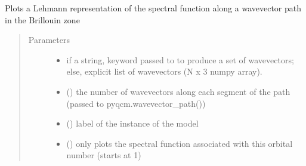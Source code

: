 \documentclass[letterpaper,10pt,english]{sphinxmanual}
\begin{document}
\begin{fulllineitems}
\label{\detokenize{spectral:pyqcm.spectral.spectral_function_Lehmann}}
\sphinxAtStartPar
Plots a Lehmann representation of the spectral function along a wavevector path in the Brillouin zone
\begin{quote}\begin{description}
\item[{Parameters}] \leavevmode\begin{itemize}
\item {} 
\sphinxAtStartPar
{} \textendash{} if a string, keyword passed to  to produce a set of wavevectors; else, explicit list of wavevectors (N x 3 numpy array).

\item {} 
\sphinxAtStartPar
{} () \textendash{} the number of wavevectors along each segment of the path (passed to pyqcm.wavevector\_path())

\item {} 
\sphinxAtStartPar
{} () \textendash{} label of the instance of the model

\item {} 
\sphinxAtStartPar
{} () \textendash{} only plots the spectral function associated with this orbital number (starts at 1)


\end{itemize}
\end{description}
\end{quote}
\end{fulllineitems}
\end{document}

